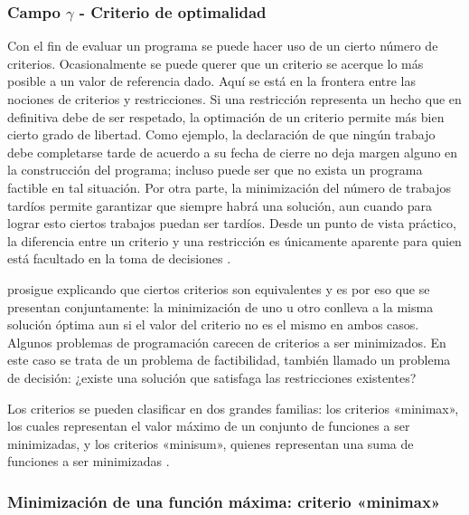 \documentclass[spanish,draft,12pt,headsepline,footsepline,paper=letter]{scrreprt}
\begin{document}
\subsubsection{Campo $\gamma$ - Criterio de optimalidad}

Con el fin de evaluar un programa se puede hacer uso de un cierto número de criterios. Ocasionalmente se puede querer que un criterio se acerque lo más posible a un valor de referencia dado. Aquí se está en la frontera entre las nociones de criterios y restricciones. Si una restricción representa un hecho que en definitiva debe de ser respetado, la optimación de un criterio permite más bien cierto grado de libertad. Como ejemplo, la declaración de que ningún trabajo debe completarse tarde de acuerdo a su fecha de cierre no deja margen alguno en la construcción del programa; incluso puede ser que no exista un programa factible en tal situación. Por otra parte, la minimización del número de trabajos tardíos permite garantizar que siempre habrá una solución, aun cuando para lograr esto ciertos trabajos puedan ser tardíos. Desde un punto de vista práctico, la diferencia entre un criterio y una restricción es únicamente aparente para quien está facultado en la toma de decisiones \citep[p.~12]{TKindt2002}.

\citet[p.~12,~13]{TKindt2002} prosigue explicando que ciertos criterios son equivalentes y es por eso que se presentan conjuntamente: la minimización de uno u otro conlleva a la misma solución óptima aun si el valor del criterio no es el mismo en ambos casos. Algunos problemas de programación carecen de criterios a ser minimizados. En este caso se trata de un problema de factibilidad, también llamado un problema de decisión: ¿existe una solución que satisfaga las restricciones existentes?

Los criterios se pueden clasificar en dos grandes familias: los criterios «minimax», los cuales representan el valor máximo de un conjunto de funciones a ser minimizadas, y los criterios «minisum», quienes representan una suma de funciones a ser minimizadas \citep[p.~13]{TKindt2002}.

\subsubsection[Criterio «minimax»]{Minimización de una función máxima: criterio «minimax»}
\end{document}
